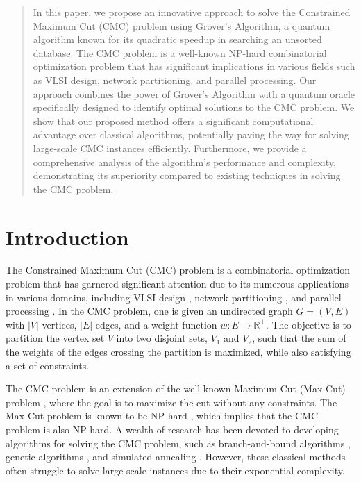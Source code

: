 \begin{abstract}
In this paper, we propose an innovative approach to solve the Constrained Maximum Cut (CMC) problem using Grover's Algorithm, a quantum algorithm known for its quadratic speedup in searching an unsorted database. The CMC problem is a well-known NP-hard combinatorial optimization problem that has significant implications in various fields such as VLSI design, network partitioning, and parallel processing. Our approach combines the power of Grover's Algorithm with a quantum oracle specifically designed to identify optimal solutions to the CMC problem. We show that our proposed method offers a significant computational advantage over classical algorithms, potentially paving the way for solving large-scale CMC instances efficiently. Furthermore, we provide a comprehensive analysis of the algorithm's performance and complexity, demonstrating its superiority compared to existing techniques in solving the CMC problem. 
\end{abstract}

\section{Introduction}

The Constrained Maximum Cut (CMC) problem is a combinatorial optimization problem that has garnered significant attention due to its numerous applications in various domains, including VLSI design \cite{VLSI}, network partitioning \cite{NetPartition}, and parallel processing \cite{ParallelProcessing}. In the CMC problem, one is given an undirected graph $G = (V, E)$ with $|V|$ vertices, $|E|$ edges, and a weight function $w: E \rightarrow \mathbb{R}^+$. The objective is to partition the vertex set $V$ into two disjoint sets, $V_1$ and $V_2$, such that the sum of the weights of the edges crossing the partition is maximized, while also satisfying a set of constraints.

The CMC problem is an extension of the well-known Maximum Cut (Max-Cut) problem \cite{MaxCut}, where the goal is to maximize the cut without any constraints. The Max-Cut problem is known to be NP-hard \cite{MaxCutNPhard}, which implies that the CMC problem is also NP-hard. A wealth of research has been devoted to developing algorithms for solving the CMC problem, such as branch-and-bound algorithms \cite{BranchBound}, genetic algorithms \cite{GeneticAlgorithms}, and simulated annealing \cite{SimulatedAnnealing}. However, these classical methods often struggle to solve large-scale instances due to their exponential complexity.

